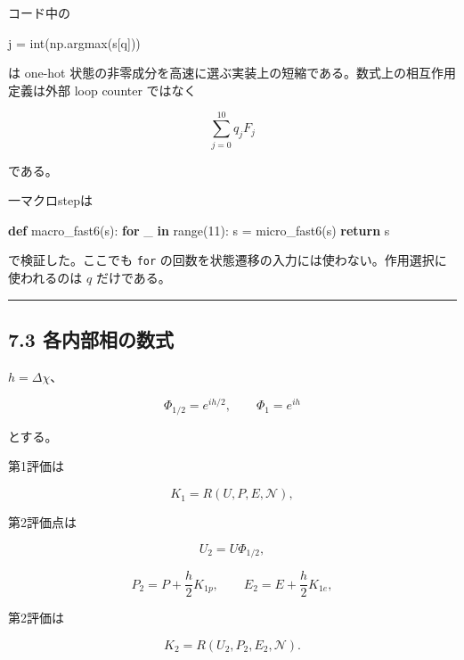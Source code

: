\documentclass[
  a4paper,
]{ltjsarticle}
\newenvironment{Shaded}{}{}
\newcommand{\BuiltInTok}[1]{\textcolor[rgb]{0.00,0.50,0.00}{#1}}
\newcommand{\ControlFlowTok}[1]{\textcolor[rgb]{0.00,0.44,0.13}{\textbf{#1}}}
\newcommand{\DecValTok}[1]{\textcolor[rgb]{0.25,0.63,0.44}{#1}}
\newcommand{\KeywordTok}[1]{\textcolor[rgb]{0.00,0.44,0.13}{\textbf{#1}}}
\newcommand{\NormalTok}[1]{#1}
\newcommand{\OperatorTok}[1]{\textcolor[rgb]{0.40,0.40,0.40}{#1}}
\newcommand{\StringTok}[1]{\textcolor[rgb]{0.25,0.44,0.63}{#1}}
\begin{document}
コード中の

\begin{Shaded}
\begin{Highlighting}[]
\NormalTok{j }\OperatorTok{=} \BuiltInTok{int}\NormalTok{(np.argmax(s[}\StringTok{\textquotesingle{}q\textquotesingle{}}\NormalTok{]))}
\end{Highlighting}
\end{Shaded}

は one-hot
状態の非零成分を高速に選ぶ実装上の短縮である。数式上の相互作用定義は外部
loop counter ではなく

\[
\sum_{j=0}^{10}q_jF_j
\]

である。

一マクロstepは

\begin{Shaded}
\begin{Highlighting}[]
\KeywordTok{def}\NormalTok{ macro\_fast6(s):}
    \ControlFlowTok{for}\NormalTok{ \_ }\KeywordTok{in} \BuiltInTok{range}\NormalTok{(}\DecValTok{11}\NormalTok{):}
\NormalTok{        s }\OperatorTok{=}\NormalTok{ micro\_fast6(s)}
    \ControlFlowTok{return}\NormalTok{ s}
\end{Highlighting}
\end{Shaded}

で検証した。ここでも \texttt{for}
の回数を状態遷移の入力には使わない。作用選択に使われるのは \(q\)
だけである。

\begin{center}\rule{0.5\linewidth}{0.5pt}\end{center}

\subsection{7.3
各内部相の数式}\label{ux5404ux5185ux90e8ux76f8ux306eux6570ux5f0f}

\(h=\Delta\chi\)、

\[
\Phi_{1/2}=e^{ih/2},
\qquad
\Phi_1=e^{ih}
\]

とする。

第1評価は

\[
K_1=R(U,P,E,\mathcal N),
\]

第2評価点は

\[
U_2=U\Phi_{1/2},
\]

\[
P_2=P+\frac h2 K_{1p},
\qquad
E_2=E+\frac h2 K_{1e},
\]

第2評価は

\[
K_2=R(U_2,P_2,E_2,\mathcal N).
\]
\end{document}
